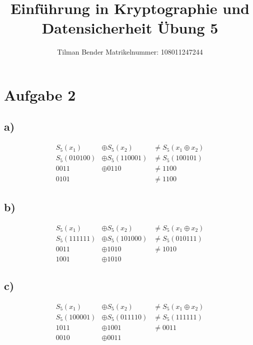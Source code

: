 \documentclass[10pt,a4paper]{article}
\author{Tilman Bender   Matrikelnummer: 108011247244\\}
\title{Einführung in Kryptographie und Datensicherheit Übung 5}
\begin{document}
\maketitle

\section*{Aufgabe 2}
\subsection*{a)}
\begin{align} 
S_{5}(x_{1}) &\oplus S_{5}(x_{2}) &\neq S_{5}(x_{1} \oplus x_{2}) \\
S_{5}(010100) &\oplus S_{5}(110001) &\neq S_{5}(100101)\\
0011 &\oplus 0110 &\neq 1100\\
0101 &&\neq 1100
\end{align}

\subsection*{b)}
\begin{align} 
S_{5}(x_{1}) &\oplus S_{5}(x_{2}) &\neq S_{5}(x_{1} \oplus x_{2}) \\
S_{5}(111111) &\oplus S_{5}(101000) &\neq S_{5}(010111)\\
0011 &\oplus 1010 &\neq 1010\\
1001 &\oplus 1010
\end{align}

\subsection*{c)}
\begin{align} 
S_{5}(x_{1}) &\oplus S_{5}(x_{2}) &\neq S_{5}(x_{1} \oplus x_{2}) \\
S_{5}(100001) &\oplus S_{5}(011110) &\neq S_{5}(111111)\\
1011 &\oplus 1001 &\neq 0011\\
0010 &\oplus 0011
\end{align}
\end{document}
